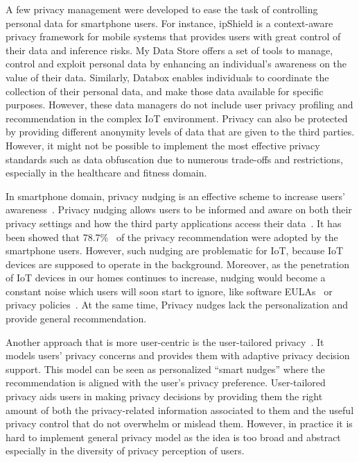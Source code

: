 A few privacy management were developed to ease the task of controlling personal data for smartphone users. For instance, ipShield\cite{chakraborty2014ipshield} is a context-aware privacy framework for mobile systems that provides users with great control of their data and inference risks. My Data Store \cite{ref:vescovi} offers a set of tools to manage, control and exploit personal data by enhancing an individual’s awareness on the value of their data. Similarly, Databox \cite{ref:chaudhry} enables individuals to coordinate the collection of their personal data, and make those data available for specific purposes. However, these data managers do not include user privacy profiling and recommendation in the complex IoT environment. Privacy can also be protected by providing different anonymity levels of data that are given to the third parties. However, it might not be possible to implement the most effective privacy standards such as data obfuscation due to numerous trade-offs and restrictions, especially in the healthcare and fitness domain.

In smartphone domain, privacy nudging is an effective scheme to increase users' awareness~\cite{almuhimedi2015your}. Privacy nudging allows users to be informed and aware on both their privacy settings and how the third party applications access their data~\cite{liu2016follow,fu2014field}. It has been showed that 78.7\%~\cite{liu2016follow} of the privacy recommendation were adopted by the smartphone users. However, such nudging are problematic for IoT, because IoT devices are supposed to operate in the background. Moreover, as the penetration of IoT devices in our homes continues to increase, nudging would become a constant noise which users will soon start to ignore, like software EULAs~\cite{good2005spyware} or privacy policies~\cite{jensen2004privacy}. At the same time,
Privacy nudges lack the personalization and provide general recommendation.  


Another approach that is more user-centric is the user-tailored privacy~\cite{knijnenburg2017privacy}. It models users’ privacy concerns and provides them with adaptive privacy decision support. This model can be seen as personalized ``smart nudges'' where the recommendation is aligned with the user's privacy preference. User-tailored privacy aids users in making privacy decisions by providing them the right amount of both the privacy-related information associated to them and the useful privacy control that do not overwhelm or mislead them. However, in practice it is hard to implement general privacy model as the idea is too broad and abstract especially in the diversity of privacy perception of users. 

